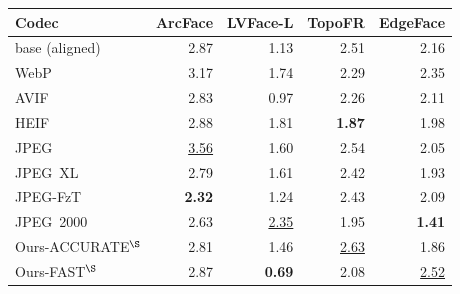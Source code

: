 \begin{tabular}{lrrrr}
\toprule
Codec & ArcFace & LVFace-L & TopoFR & EdgeFace \\
\midrule
    base (aligned) & 2.87 & 1.13 & 2.51 & 2.16 \\
    WebP & 3.17 & 1.74 & 2.29 & 2.35 \\
    AVIF & 2.83 & 0.97 & 2.26 & 2.11 \\
    HEIF & 2.88 & 1.81 & \cellcolor{green!25}\textbf{1.87} & 1.98 \\
    JPEG & \cellcolor{red!22}\underline{3.56} & 1.60 & 2.54 & 2.05 \\
    JPEG~XL & 2.79 & 1.61 & 2.42 & 1.93 \\
    JPEG-FzT & \cellcolor{green!25}\textbf{2.32} & 1.24 & 2.43 & 2.09 \\
    JPEG~2000 & 2.63 & \cellcolor{red!22}\underline{2.35} & 1.95 & \cellcolor{green!25}\textbf{1.41} \\
    Ours-ACCURATE$^{\S}$ & 2.81 & 1.46 & \cellcolor{red!22}\underline{2.63} & 1.86 \\
    Ours-FAST$^{\S}$ & 2.87 & \cellcolor{green!25}\textbf{0.69} & 2.08 & \cellcolor{red!22}\underline{2.52} \\
\bottomrule
\end{tabular}

